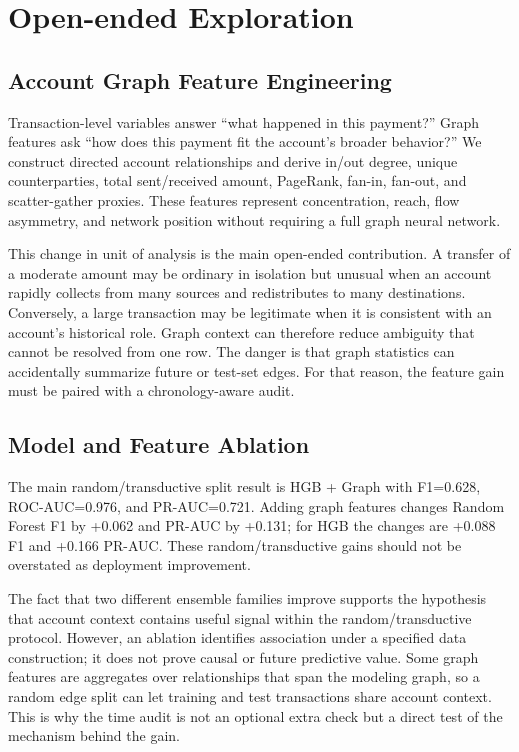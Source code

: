 \documentclass{article}
\begin{document}
\section{Open-ended Exploration}
\subsection{Account Graph Feature Engineering}
Transaction-level variables answer ``what happened in this payment?'' Graph features ask ``how does this payment fit the account's broader behavior?'' We construct directed account relationships and derive in/out degree, unique counterparties, total sent/received amount, PageRank, fan-in, fan-out, and scatter-gather proxies. These features represent concentration, reach, flow asymmetry, and network position without requiring a full graph neural network.

This change in unit of analysis is the main open-ended contribution. A transfer of a moderate amount may be ordinary in isolation but unusual when an account rapidly collects from many sources and redistributes to many destinations. Conversely, a large transaction may be legitimate when it is consistent with an account's historical role. Graph context can therefore reduce ambiguity that cannot be resolved from one row. The danger is that graph statistics can accidentally summarize future or test-set edges. For that reason, the feature gain must be paired with a chronology-aware audit.

\subsection{Model and Feature Ablation}
The main random/transductive split result is HGB + Graph with F1=0.628, ROC-AUC=0.976, and PR-AUC=0.721. Adding graph features changes Random Forest F1 by +0.062 and PR-AUC by +0.131; for HGB the changes are +0.088 F1 and +0.166 PR-AUC. These random/transductive gains should not be overstated as deployment improvement.

The fact that two different ensemble families improve supports the hypothesis that account context contains useful signal within the random/transductive protocol. However, an ablation identifies association under a specified data construction; it does not prove causal or future predictive value. Some graph features are aggregates over relationships that span the modeling graph, so a random edge split can let training and test transactions share account context. This is why the time audit is not an optional extra check but a direct test of the mechanism behind the gain.
\end{document}

